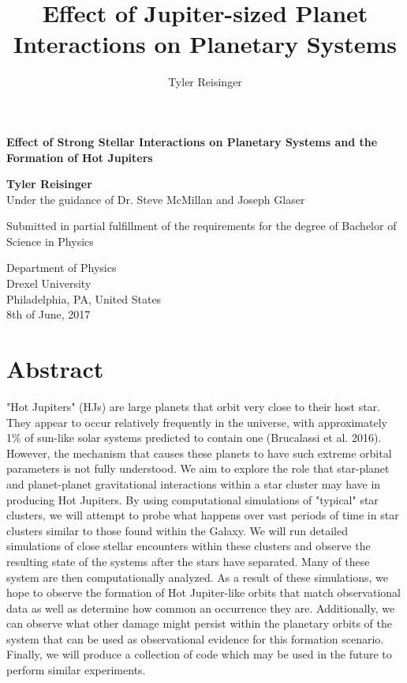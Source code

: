 \documentclass[12pt]{article}
\author{Tyler Reisinger}
\title{Effect of Jupiter-sized Planet Interactions on Planetary Systems}
\date{}
\begin{document}
\begin{titlepage}
    \begin{center}
        \vspace*{1cm}
        
        \textbf{Effect of Strong Stellar Interactions on Planetary Systems and
            the Formation of Hot Jupiters}
        
        \vspace{1.5cm}
        
        \textbf{Tyler Reisinger}\\
        Under the guidance of Dr. Steve McMillan and Joseph Glaser
        
        \vfill
        
        Submitted in partial fulfillment of the requirements for the
        degree of Bachelor of Science in Physics
        
        \vspace{0.8cm}

        Department of Physics \\
        Drexel University \\
        Philadelphia, PA, United States\\
        8th of June, 2017 
    \end{center}
\end{titlepage}

\tableofcontents

\clearpage

\section{Abstract}

"Hot Jupiters" (HJs) are large planets that orbit very close to their host star. 
They appear to occur relatively frequently in the universe, with approximately 1\% 
of sun-like solar systems predicted to contain one (Brucalassi et al. 2016). 
However, the mechanism that causes these planets to have such extreme orbital parameters
is not fully understood. 
We aim to explore the role that star-planet and planet-planet gravitational interactions 
within a star cluster may have in producing Hot 
Jupiters. By using computational simulations of "typical" star clusters,
we will attempt to probe what happens over vast periods of time
in star clusters similar to those found within the Galaxy.
We will run detailed simulations of close stellar encounters within these clusters
and observe the resulting state of the systems after the stars have separated. Many
of these system are then computationally analyzed.
As a result of these simulations, 
we hope to observe the formation of Hot Jupiter-like orbits that
match observational data as well as determine how common an occurrence they are.
Additionally, we can observe what other damage might 
persist within the planetary orbits of the system that can be used as 
observational evidence for this formation scenario. Finally, we will
produce a collection of code which may be used in the future to perform similar
experiments.
\end{document}
